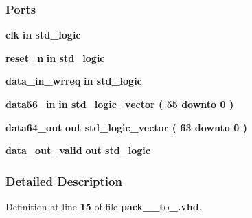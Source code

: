 \subsubsection*{Ports}
 \begin{DoxyCompactItemize}
\item 
{\bf clk}  {\bfseries {\bfseries \textcolor{keywordflow}{in}\textcolor{vhdlchar}{ }}} {\bfseries \textcolor{comment}{std\+\_\+logic}\textcolor{vhdlchar}{ }} 
\item 
{\bf reset\+\_\+n}  {\bfseries {\bfseries \textcolor{keywordflow}{in}\textcolor{vhdlchar}{ }}} {\bfseries \textcolor{comment}{std\+\_\+logic}\textcolor{vhdlchar}{ }} 
\item 
{\bf data\+\_\+in\+\_\+wrreq}  {\bfseries {\bfseries \textcolor{keywordflow}{in}\textcolor{vhdlchar}{ }}} {\bfseries \textcolor{comment}{std\+\_\+logic}\textcolor{vhdlchar}{ }} 
\item 
{\bf data56\+\_\+in}  {\bfseries {\bfseries \textcolor{keywordflow}{in}\textcolor{vhdlchar}{ }}} {\bfseries \textcolor{comment}{std\+\_\+logic\+\_\+vector}\textcolor{vhdlchar}{ }\textcolor{vhdlchar}{(}\textcolor{vhdlchar}{ }\textcolor{vhdlchar}{ } \textcolor{vhdldigit}{55} \textcolor{vhdlchar}{ }\textcolor{keywordflow}{downto}\textcolor{vhdlchar}{ }\textcolor{vhdlchar}{ } \textcolor{vhdldigit}{0} \textcolor{vhdlchar}{ }\textcolor{vhdlchar}{)}\textcolor{vhdlchar}{ }} 
\item 
{\bf data64\+\_\+out}  {\bfseries {\bfseries \textcolor{keywordflow}{out}\textcolor{vhdlchar}{ }}} {\bfseries \textcolor{comment}{std\+\_\+logic\+\_\+vector}\textcolor{vhdlchar}{ }\textcolor{vhdlchar}{(}\textcolor{vhdlchar}{ }\textcolor{vhdlchar}{ } \textcolor{vhdldigit}{63} \textcolor{vhdlchar}{ }\textcolor{keywordflow}{downto}\textcolor{vhdlchar}{ }\textcolor{vhdlchar}{ } \textcolor{vhdldigit}{0} \textcolor{vhdlchar}{ }\textcolor{vhdlchar}{)}\textcolor{vhdlchar}{ }} 
\item 
{\bf data\+\_\+out\+\_\+valid}  {\bfseries {\bfseries \textcolor{keywordflow}{out}\textcolor{vhdlchar}{ }}} {\bfseries \textcolor{comment}{std\+\_\+logic}\textcolor{vhdlchar}{ }} 
\end{DoxyCompactItemize}


\subsubsection{Detailed Description}


Definition at line {\bf 15} of file {\bf pack\+\_\+\_\+to\+\_.\+vhd}.



